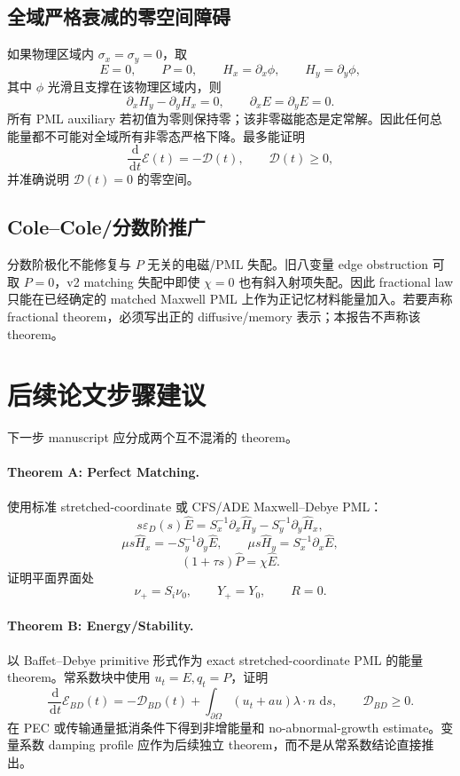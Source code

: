 \documentclass[UTF8,a4paper,11pt]{ctexart}
\newcommand{\dd}{\,\mathrm d}
\newcommand{\Om}{\Omega}
\newcommand{\Ecal}{\mathcal E}
\newcommand{\Dcal}{\mathcal D}
\newcommand{\eps}{\varepsilon}
\begin{document}
\subsection{全域严格衰减的零空间障碍}

如果物理区域内 \(\sigma_x=\sigma_y=0\)，取
\[
E=0,\qquad P=0,\qquad H_x=\partial_x\phi,\qquad H_y=\partial_y\phi,
\]
其中 \(\phi\) 光滑且支撑在该物理区域内，则
\[
\partial_xH_y-\partial_yH_x=0,\qquad
\partial_xE=\partial_yE=0.
\]
所有 PML auxiliary 若初值为零则保持零；该非零磁能态是定常解。因此任何总能量都不可能对全域所有非零态严格下降。最多能证明
\[
\frac{\dd}{\dd t}\Ecal(t)=-\Dcal(t),\qquad \Dcal(t)\ge0,
\]
并准确说明 \(\Dcal(t)=0\) 的零空间。

\subsection{Cole--Cole/分数阶推广}

分数阶极化不能修复与 \(P\) 无关的电磁/PML 失配。旧八变量 edge obstruction 可取
\(P=0\)，v2 matching 失配中即使 \(\chi=0\) 也有斜入射项失配。因此 fractional law
只能在已经确定的 matched Maxwell PML 上作为正记忆材料能量加入。若要声称 fractional
theorem，必须写出正的 diffusive/memory 表示；本报告不声称该 theorem。

\section{后续论文步骤建议}

下一步 manuscript 应分成两个互不混淆的 theorem。

\paragraph{Theorem A: Perfect Matching.}
使用标准 stretched-coordinate 或 CFS/ADE Maxwell--Debye PML：
\[
s\eps_D(s)\widehat E
=S_x^{-1}\partial_x\widehat H_y-S_y^{-1}\partial_y\widehat H_x,
\]
\[
\mu s\widehat H_x=-S_y^{-1}\partial_y\widehat E,\qquad
\mu s\widehat H_y=S_x^{-1}\partial_x\widehat E,
\]
\[
(1+\tau s)\widehat P=\chi\widehat E.
\]
证明平面界面处
\[
\nu_+=S_i\nu_0,\qquad Y_+=Y_0,\qquad R=0.
\]

\paragraph{Theorem B: Energy/Stability.}
以 Baffet--Debye primitive 形式作为 exact stretched-coordinate PML 的能量 theorem。常系数块中使用 \(u_t=E,q_t=P\)，证明
\[
\frac{\dd}{\dd t}\Ecal_{BD}(t)
=-\Dcal_{BD}(t)
+\int_{\partial\Om}(u_t+a u)\lambda\cdot n\,\dd s,
\qquad \Dcal_{BD}\ge0.
\]
在 PEC 或传输通量抵消条件下得到非增能量和 no-abnormal-growth estimate。变量系数
damping profile 应作为后续独立 theorem，而不是从常系数结论直接推出。
\end{document}

